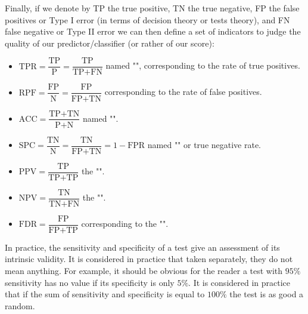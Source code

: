 	Finally, if we denote by TP the true positive, TN the true negative, FP the false positives or Type I error (in terms of decision theory or tests theory), and FN false negative or Type II error we can then define a set of indicators to judge the quality of our predictor/classifier (or rather of our score):
	
	\begin{itemize}
		\item $\text{TPR} = \dfrac{\text{TP}}{\text{P}} = \dfrac{\text{TP}}{\text{TP+FN}}$ named "", corresponding to the rate of true positives.
		
		\item $\text{RPF} = \dfrac{\text{FP}}{\text{N}} = \dfrac{\text{FP}}{\text{FP+TN}}$ corresponding to the rate of false positives.
		
		\item $\text{ACC} = \dfrac{\text{TP+TN}}{\text{P+N}}$ named "".
		
		 \item $\text{SPC} = \dfrac{\text{TN}}{\text{N}} = \dfrac{\text{TN}}{\text{FP+TN}}=1-\text{FPR}$ named "" or true negative rate.
		 
		 \item $\text{PPV} = \dfrac{\text{TP}}{\text{TP+TP}}$ the "".
		 
		 \item $\text{NPV} = \dfrac{\text{TN}}{\text{TN+FN}}$ the "".
		 
		 \item $\text{FDR} = \dfrac{\text{FP}}{\text{FP+TP}}$ corresponding to the  "".
	\end{itemize}
	\begin{tcolorbox}[title=Remark,colframe=black,arc=10pt]
	In practice, the sensitivity and specificity of a test give an assessment of its intrinsic validity. It is considered in practice that taken separately, they do not mean anything. For example, it should be obvious for the reader a test with $95\%$ sensitivity has no value if its specificity is only $5\%$. It is considered in practice that if the sum of sensitivity and specificity is equal to $100\%$ the test is as good a random.
	\end{tcolorbox}
